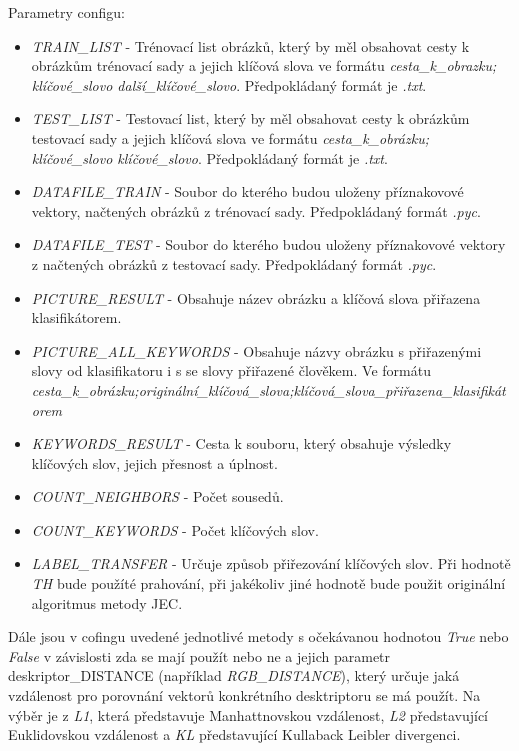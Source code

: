 \documentclass[czech,BP]{thesiskiv}
\begin{document}
\vspace{1cm} 
Parametry configu:
\begin{itemize}
	\item \textit{TRAIN\_LIST} - Trénovací list obrázků, který by měl obsahovat cesty k obrázkům trénovací sady a jejich klíčová slova ve formátu \textit{cesta\_k\_obrazku; klíčové\_slovo další\_klíčové\_slovo}. Předpokládaný formát je \textit{.txt}.
	\item \textit{TEST\_LIST} - Testovací list, který by měl obsahovat cesty k obrázkům testovací sady a jejich klíčová slova ve formátu \textit{cesta\_k\_obrázku; klíčové\_slovo klíčové\_slovo}. Předpokládaný formát je \textit{.txt}.
	\item \textit{DATAFILE\_TRAIN} - Soubor do kterého budou uloženy příznakovové vektory, načtených obrázků z trénovací sady. Předpokládaný formát \textit{.pyc}.
		\item \textit{DATAFILE\_TEST} - Soubor do kterého budou uloženy příznakovové vektory z načtených obrázků z testovací sady. Předpokládaný formát \textit{.pyc}.
	\item \textit{PICTURE\_RESULT} - Obsahuje název obrázku a klíčová slova přiřazena klasifikátorem.
	\item \textit{PICTURE\_ALL\_KEYWORDS} - Obsahuje názvy obrázku s přiřazenými slovy od klasifikatoru i s se slovy přiřazené člověkem. Ve formátu \textit{cesta\_k\_obrázku;originální\_klíčová\_slova;klíčová\_slova\_přiřazena\_klasifikátorem}
	\item \textit{KEYWORDS\_RESULT} - Cesta k souboru, který obsahuje výsledky klíčových slov, jejich přesnost a úplnost.
	\item \textit{COUNT\_NEIGHBORS} - Počet sousedů.
	\item \textit{COUNT\_KEYWORDS} - Počet klíčových slov.
	\item \textit{LABEL\_TRANSFER} - Určuje způsob přiřezování klíčových slov. Při hodnotě \textit{TH} bude použíté prahování, při jakékoliv jiné hodnotě bude použit originální algoritmus metody JEC.
\end{itemize}
Dále jsou v cofingu uvedené jednotlivé metody s očekávanou hodnotou \textit{True} nebo \textit{False} v závislosti zda se mají použít nebo ne a jejich parametr deskriptor\_DISTANCE (například \textit{RGB\_DISTANCE}), který určuje jaká vzdálenost pro porovnání vektorů konkrétního desktriptoru se má použít. Na výběr je z \textit{L1}, která představuje Manhattnovskou vzdálenost, \textit{L2} představující Euklidovskou vzdálenost a \textit{KL} představující Kullaback Leibler divergenci.
\end{document}
